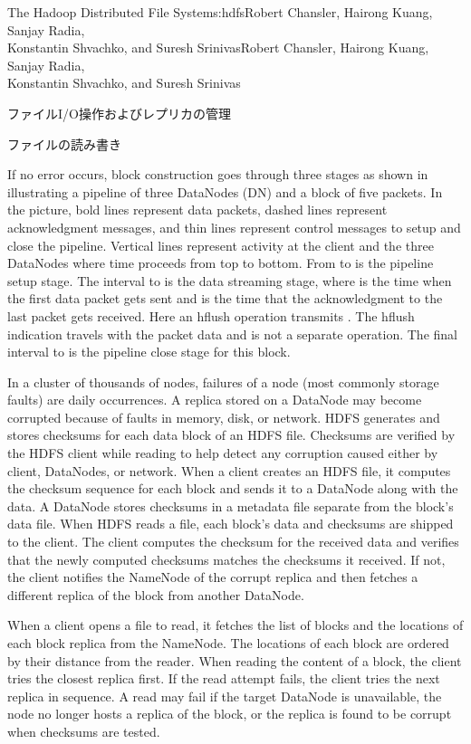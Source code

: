 \begin{aosachaptertoc}{The Hadoop Distributed File System}{s:hdfs}{Robert Chansler, Hairong Kuang, Sanjay Radia, \\ Konstantin Shvachko, and Suresh Srinivas}{Robert Chansler, Hairong Kuang, Sanjay Radia, \\ \hspace*{0.9cm} Konstantin Shvachko, and Suresh Srinivas}
\begin{aosasect1}{ファイルI/O操作およびレプリカの管理}
\begin{aosasect2}{ファイルの読み書き}

If no error occurs, block construction goes through three stages as
shown in  illustrating a pipeline of three
DataNodes (DN) and a block of five packets.  In the picture, bold
lines represent data packets, dashed lines represent acknowledgment
messages, and thin lines represent control messages to setup and close
the pipeline. Vertical lines represent activity at the client and the
three DataNodes where time proceeds from top to bottom.  From
 to  is the pipeline setup stage. The interval
 to  is the data streaming stage, where  is
the time when the first data packet gets sent and  is the
time that the acknowledgment to the last packet gets received. Here an
hflush operation transmits .  The hflush indication
travels with the packet data and is not a separate operation. The
final interval  to  is the pipeline close stage for
this block.

In a cluster of thousands of nodes, failures of a node (most commonly
storage faults) are daily occurrences. A replica stored on a DataNode
may become corrupted because of faults in memory, disk, or network.
HDFS generates and stores checksums for each data block of an HDFS
file. Checksums are verified by the HDFS client while reading to help
detect any corruption caused either by client, DataNodes, or
network. When a client creates an HDFS file, it computes the checksum
sequence for each block and sends it to a DataNode along with the
data. A DataNode stores checksums in a metadata file separate from the
block's data file. When HDFS reads a file, each block's data and
checksums are shipped to the client. The client computes the checksum
for the received data and verifies that the newly computed checksums
matches the checksums it received. If not, the client notifies the
NameNode of the corrupt replica and then fetches a different replica
of the block from another DataNode.

When a client opens a file to read, it fetches the list of blocks and
the locations of each block replica from the NameNode. The locations
of each block are ordered by their distance from the reader. When
reading the content of a block, the client tries the closest replica
first. If the read attempt fails, the client tries the next replica in
sequence. A read may fail if the target DataNode is unavailable, the
node no longer hosts a replica of the block, or the replica is found
to be corrupt when checksums are tested.


\end{aosasect2}
\end{aosasect1}
\end{aosachaptertoc}
